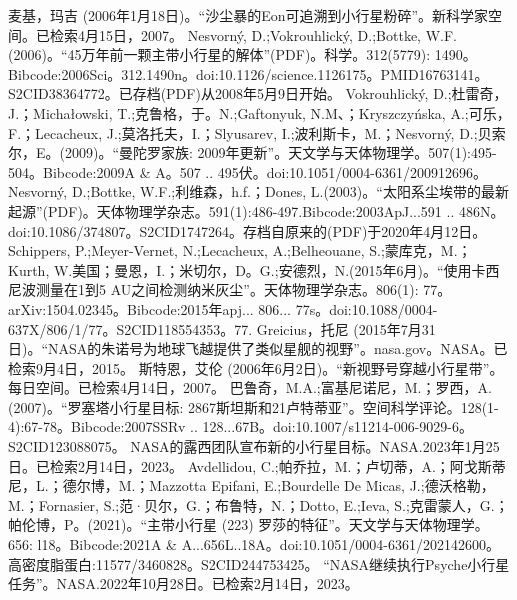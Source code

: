 \begin{enumerate}
 麦基，玛吉 (2006年1月18日)。“沙尘暴的Eon可追溯到小行星粉碎”。新科学家空间。已检索4月15日，2007。
 Nesvorný, D.;Vokrouhlický, D.;Bottke, W.F.(2006)。“45万年前一颗主带小行星的解体”(PDF)。科学。312(5779): 1490。Bibcode:2006Sci。312.1490n。doi:10.1126/science.1126175。PMID16763141。S2CID38364772。已存档(PDF)从2008年5月9日开始。   
 Vokrouhlický, D.;杜雷奇，J.；Michałowski, T.;克鲁格，于。N.;Gaftonyuk, N.M、；Kryszczyńska, A.;可乐，F.；Lecacheux, J.;莫洛托夫，I.；Slyusarev, I.;波利斯卡，M.；Nesvorný, D.;贝索尔，E。(2009)。“曼陀罗家族: 2009年更新”。天文学与天体物理学。507(1):495-504。Bibcode:2009A & A。507 .. 495伏。doi:10.1051/0004-6361/200912696。
 Nesvorný, D.;Bottke, W.F.;利维森，h.f.；Dones, L.(2003)。“太阳系尘埃带的最新起源”(PDF)。天体物理学杂志。591(1):486-497.Bibcode:2003ApJ...591 .. 486N。doi:10.1086/374807。S2CID1747264。存档自原来的(PDF)于2020年4月12日。  
 Schippers, P.;Meyer-Vernet, N.;Lecacheux, A.;Belheouane, S.;蒙库克，M.；Kurth, W.美国；曼恩，I.；米切尔，D。G.;安德烈，N.(2015年6月)。“使用卡西尼波测量在1到5 AU之间检测纳米灰尘”。天体物理学杂志。806(1): 77。arXiv:1504.02345。Bibcode:2015年apj... 806... 77s。doi:10.1088/0004-637X/806/1/77。S2CID118554353。77. 
 Greicius，托尼 (2015年7月31日)。“NASA的朱诺号为地球飞越提供了类似星舰的视野”。nasa.gov。NASA。已检索9月4日，2015。
 斯特恩，艾伦 (2006年6月2日)。“新视野号穿越小行星带”。每日空间。已检索4月14日，2007。
 巴鲁奇，M.A.;富基尼诺尼，M.；罗西，A.(2007)。“罗塞塔小行星目标: 2867斯坦斯和21卢特蒂亚”。空间科学评论。128(1-4):67-78。Bibcode:2007SSRv .. 128...67B。doi:10.1007/s11214-006-9029-6。S2CID123088075。 
 NASA的露西团队宣布新的小行星目标。NASA.2023年1月25日。已检索2月14日，2023。
 Avdellidou, C.;帕乔拉，M.；卢切蒂，A.；阿戈斯蒂尼，L.；德尔博，M.；Mazzotta Epifani, E.;Bourdelle De Micas, J.;德沃格勒，M.；Fornasier, S.;范·贝尔，G.；布鲁特，N.；Dotto, E.;Ieva, S.;克雷蒙人，G.；帕伦博，P。(2021)。“主带小行星 (223) 罗莎的特征”。天文学与天体物理学。656: l18。Bibcode:2021A & A...656L..18A。doi:10.1051/0004-6361/202142600。高密度脂蛋白:11577/3460828。S2CID244753425。 
 “NASA继续执行Psyche小行星任务”。NASA.2022年10月28日。已检索2月14日，2023。
 \end{enumerate}